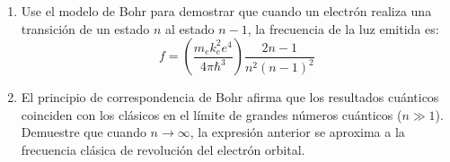 \item \begin{enumerate}
    \item Use el modelo de Bohr para demostrar que cuando un electrón realiza una transición de un estado $n$ al estado $n - 1$, la frecuencia de la luz emitida es:
    $$ f = \left( \frac{m_e k_e^2 e^4}{4\pi\hbar^3} \right) \frac{2n - 1}{n^2 (n - 1)^2} $$
    \item El principio de correspondencia de Bohr afirma que los resultados cuánticos coinciden con los clásicos en el límite de grandes números cuánticos ($n \gg 1$). Demuestre que cuando $n \to \infty$, la expresión anterior se aproxima a la frecuencia clásica de revolución del electrón orbital.
\end{enumerate}